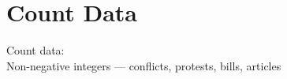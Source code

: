 
\section{Count Data}

\begin{transitionframe}
Count data:\\[6pt]
{\large Non-negative integers --- conflicts, protests, bills, articles}
\end{transitionframe}
\note{}

